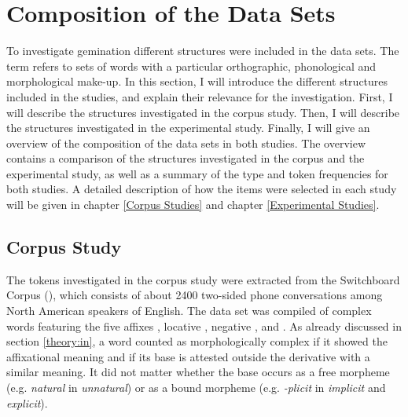 \section{Composition of the Data Sets} \label{General Method Data Sets}

To investigate gemination different structures were included in the data sets. The term  refers to sets of words with a particular orthographic, phonological and morphological make-up. In this section, I will introduce the different structures included in the studies, and explain their relevance for the investigation.
 First, I will describe the structures investigated in the corpus study. Then, I will describe the structures investigated in the experimental study. Finally, I will give an overview of the composition of the data sets in both studies. The overview contains a comparison of the structures investigated in the corpus and the experimental study, as well as a summary of the type and token frequencies for both studies. A detailed description of how the items were selected in each study will be given in chapter \ref{Corpus Studies} and chapter \ref{Experimental Studies}.


\subsection{Corpus Study}\label{corpus data composition}

The tokens investigated in the corpus study were extracted from the Switchboard Corpus (\citealt{Godfrey.1997}), which consists of about 2400 two-sided phone conversations among North American speakers of English.  The data set was compiled of complex words featuring the five affixes , locative , negative ,  and . As already discussed in section \ref{theory:in},  a word counted as morphologically complex if it showed the affixational meaning and if its base is attested outside the derivative with a similar meaning. It did not matter whether the base occurs as a free morpheme (e.g. \textit{natural} in \textit{unnatural}) or as a bound morpheme (e.g. \textit{-plicit} in \textit{implicit}  and  \textit{explicit}). 


